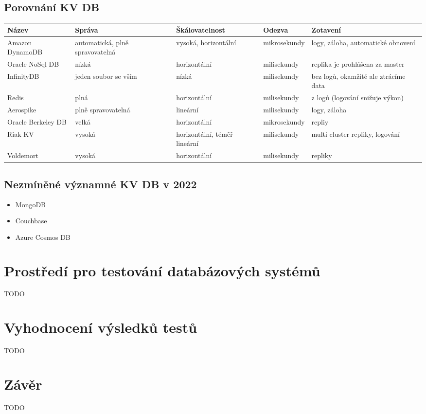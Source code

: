 \documentclass[czech,bachelor,dept460,male,csharp,cpdeclaration]{diploma}
\begin{document}
	\section {Porovnání KV DB}
			\begin{tabular}{ |l||p{2cm} p{2cm} l p{4cm} | } 
				\hline
				Název & Správa & Škálovatelnost & Odezva & Zotavení \\
				\hline
				Amazon DynamoDB & automatická, plně spravovatelná & vysoká, horizontální & mikrosekundy & logy, záloha, automatické obnovení \\
				\hline
				Oracle NoSql DB & nízká & horizontální & milisekundy & replika je prohlášena za master\\ 
				\hline
				InfinityDB & jeden soubor se vším & nízká & milisekundy & bez logů, okamžité ale ztrácíme data\\ 
				\hline
				Redis & plná & horizontální & milisekundy & z logů (logování snižuje výkon)\\
				\hline
				Aerospike & plně spravovatelná & lineární & milisekundy &  logy, záloha\\
				\hline
				Oracle Berkeley DB & velká & horizontální & mikrosekundy & repliy \\
				\hline
				Riak KV & vysoká & horizontální, téměř lineární & milisekundy & multi cluster repliky, logování\\
				\hline
				Voldemort & vysoká & horizontální & milisekundy &  repliky \\
				\hline
			\end{tabular}


	\section {Nezmíněné významné KV DB v 2022}
		\begin{itemize}
			\item MongoDB
			\item Couchbase
			\item Azure Cosmos DB
		\end{itemize}

	\chapter{Prostředí pro testování databázových systémů}
	
	TODO
	
	\chapter{Vyhodnocení výsledků testů}
	
	TODO
	
	\chapter{Závěr}
	
	TODO
		
	\nocite{*}
	
	\printbibliography[title={Literatura}, heading=bibintoc]
	
\end{document}
